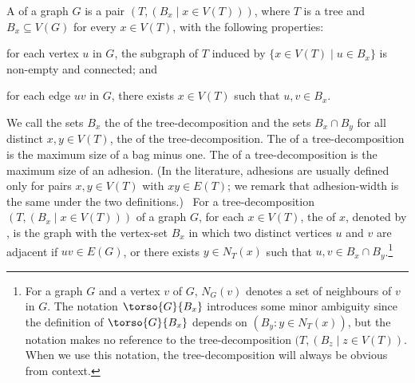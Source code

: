 A  of a graph $G$ is a pair $(T,(B_x \mid x \in V(T)))$,
where $T$ is a tree and $B_x \subseteq V(G)$ for every $x \in V(T)$, with the
following properties:
\begin{enumerate*}[label=(\alph*)]
  \item for each vertex $u$ in $G$, the subgraph of $T$ induced by $\{x \in V(T) \mid u \in B_x\}$ is non-empty and connected; and
  \item for each edge $uv$ in $G$, there exists $x\in V(T)$ such that $u,v\in B_x$.
\end{enumerate*}
We call the sets $B_x$ the  of the tree-decomposition and the sets $B_x\cap B_y$ for all distinct $x,y\in V(T)$, the  of the tree-decomposition.
The  of a tree-decomposition is the maximum size of a bag minus one.
The  of a tree-decomposition is the maximum size of an adhesion.
(In the literature, adhesions are usually defined only for pairs $x,y \in V(T)$ with $xy \in E(T)$; we remark that adhesion-width is the same under the two definitions.)\
  For a tree-decomposition $(T,(B_x \mid x\in V(T)))$ of a graph $G$, for each  $x\in V(T)$, the  of $x$, denoted by , is the graph with the vertex-set $B_x$ in which two distinct vertices $u$ and $v$ are adjacent if $uv \in E(G)$, or there exists $y \in N_T(x)$  such that $u,v \in B_x \cap B_y$.\footnote{For a graph $G$ and a vertex $v$ of $G$, $N_G(v)$ denotes a set of neighbours of $v$ in $G$. The notation $\torso{G}{B_x}$ introduces some minor ambiguity since the definition of $\torso{G}{B_x}$ depends on $(B_y:y\in N_T(x))$, but the notation makes no reference to the tree-decomposition $(T, (B_z\mid z\in V(T))$.  When we use this notation, the tree-decomposition will always be obvious from context.} 



